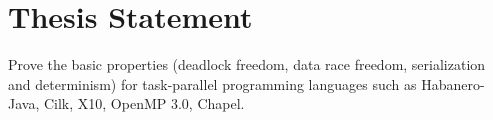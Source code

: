 \section{Thesis Statement}
Prove the basic properties (deadlock freedom, data race freedom, serialization and determinism) for task-parallel programming languages such as Habanero-Java, Cilk, X10, OpenMP 3.0, Chapel.
